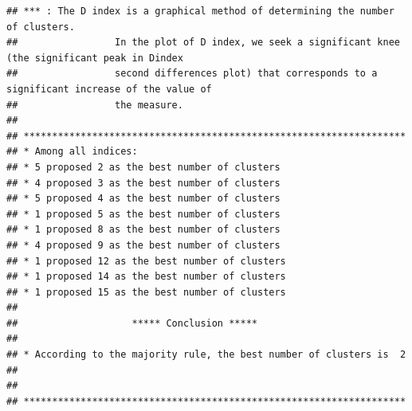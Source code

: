 \documentclass[
]{article}
\begin{document}
\begin{verbatim}
## *** : The D index is a graphical method of determining the number of clusters. 
##                 In the plot of D index, we seek a significant knee (the significant peak in Dindex
##                 second differences plot) that corresponds to a significant increase of the value of
##                 the measure. 
##  
## ******************************************************************* 
## * Among all indices:                                                
## * 5 proposed 2 as the best number of clusters 
## * 4 proposed 3 as the best number of clusters 
## * 5 proposed 4 as the best number of clusters 
## * 1 proposed 5 as the best number of clusters 
## * 1 proposed 8 as the best number of clusters 
## * 4 proposed 9 as the best number of clusters 
## * 1 proposed 12 as the best number of clusters 
## * 1 proposed 14 as the best number of clusters 
## * 1 proposed 15 as the best number of clusters 
## 
##                    ***** Conclusion *****                            
##  
## * According to the majority rule, the best number of clusters is  2 
##  
##  
## *******************************************************************
\end{verbatim}
\end{document}
